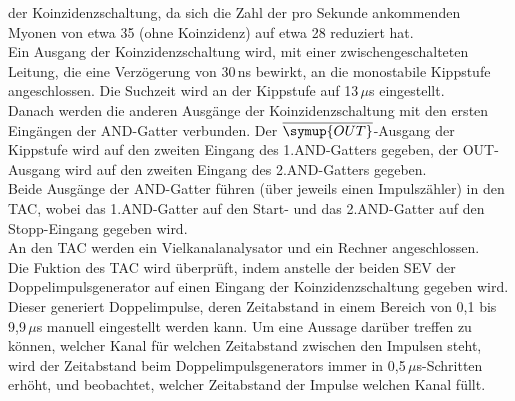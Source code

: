     der Koinzidenzschaltung, da sich die Zahl der pro Sekunde ankommenden
    Myonen von etwa 35 (ohne Koinzidenz) auf etwa 28 reduziert hat.\\
    Ein Ausgang der Koinzidenzschaltung wird, mit einer zwischengeschalteten
    Leitung, die eine Verzögerung von 30\,ns bewirkt, an die monostabile
    Kippstufe angeschlossen. Die Suchzeit wird an der Kippstufe auf 13\,$\mu$s
    eingestellt.\\
    Danach werden die anderen Ausgänge der Koinzidenzschaltung
    mit den ersten Eingängen der AND-Gatter verbunden.
    Der $\overline{\symup{OUT}}$-Ausgang der Kippstufe wird auf den zweiten
    Eingang des 1.AND-Gatters gegeben, der OUT-Ausgang wird auf den zweiten
    Eingang des 2.AND-Gatters gegeben.\\
    Beide Ausgänge der AND-Gatter führen (über jeweils einen Impulszähler)
    in den TAC, wobei das 1.AND-Gatter auf den Start- und das 2.AND-Gatter
    auf den Stopp-Eingang gegeben wird. \\
    An den TAC werden ein Vielkanalanalysator und ein Rechner angeschlossen.\\
    Die Fuktion des TAC wird überprüft, indem anstelle der beiden SEV
    der Doppelimpulsgenerator auf einen Eingang der Koinzidenzschaltung gegeben wird.
    Dieser generiert Doppelimpulse, deren Zeitabstand in einem Bereich
    von 0,1 bis 9,9\,$\mu$s manuell eingestellt werden kann.
    Um eine Aussage darüber treffen zu können, welcher Kanal für welchen
    Zeitabstand zwischen den Impulsen steht, wird der Zeitabstand beim
    Doppelimpulsgenerators immer in 0,5\,$\mu$s-Schritten erhöht, und beobachtet,
    welcher Zeitabstand der Impulse welchen Kanal füllt.
